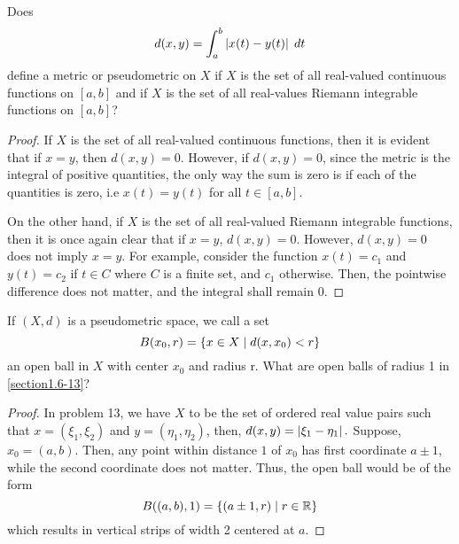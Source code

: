 \begin{question}
    Does 
    \[d(x,y) = \int_{a}^{b} \left\lvert x(t) - y(t) \right\rvert \; dt\]
    define a metric or pseudometric on $X$ if $X$ is the set of all real-valued continuous functions on $[a,b]$ and if $X$ is the set of all real-values Riemann integrable functions on $[a,b]$?
    \label{section1.6-14}
\end{question}
\begin{proof}
    If $X$ is the set of all real-valued continuous functions, then it is evident that if $x = y$, then $d(x,y) = 0$. However, if $d(x,y) = 0$, since the metric is the integral of positive quantities, the only way the sum is zero is if each of the quantities is zero, i.e $x(t) = y(t)$ for all $t \in [a,b]$.

    On the other hand, if $X$ is the set of all real-valued Riemann integrable functions, then it is once again clear that if $x = y$, $d(x,y) = 0$. However, $d(x,y) = 0$ does not imply $x = y$. For example, consider the function $x(t) = c_1$ and $y(t) = c_2$ if $t \in C$ where $C$ is a finite set, and $c_1$ otherwise. Then, the pointwise difference does not matter, and the integral shall remain $0$.
\end{proof}

\begin{question}
    If $(X,d)$ is a pseudometric space, we call a set
    \[B(x_0 , r) = \{x \in X \mid d(x,x_0) < r\}\]
    an open ball in $X$ with center $x_0$ and radius r. What are open balls of radius 1 in \ref{section1.6-13}?
    \label{section1.6-15}
\end{question}
\begin{proof}
    In problem 13, we have $X$ to  be the set of ordered real value pairs such that $x = (\xi_1 , \xi_2)$ and $y = (\eta_1 , \eta_2)$, then, $d(x,y) = \left\lvert \xi_1 - \eta_1 \right\rvert.$ Suppose, $x_0 = (a , b)$. Then, any point within distance $1$ of $x_0$ has first coordinate $a \pm 1$, while the second coordinate does not matter. Thus, the open ball would be of the form
    \[B((a,b) , 1) = \{(a \pm 1 , r) \mid r \in \mathbb{R}\}\]
    which results in vertical strips of width 2 centered at $a$.
\end{proof}